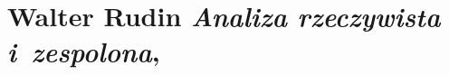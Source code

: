 \documentclass[a4paper,11pt]{article}
\numberwithin{equation}{section}
\begin{document}
\VerSpaceTwo













\newpage

\section{Walter Rudin \textit{Analiza rzeczywista
    i~zespolona},
  \parencite{Rudin-Analiza-rzeczywista-i-zespolona-Pub-1986}}





\vspace{0em}


\noindent





\newpage

\end{document}
